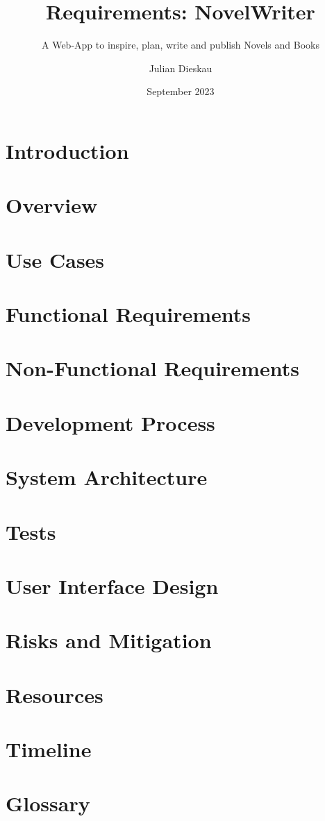 \documentclass[parskip=full,11pt]{scrartcl}
\title{Requirements: NovelWriter}
\subtitle{A Web-App to inspire, plan, write and publish Novels and Books}
\author{Julian Dieskau}
\date{September 2023}
\begin{document}
\maketitle
\pagebreak

\section{Introduction}


\section{Overview}


\section{Use Cases}

\pagebreak

\section{Functional Requirements}


\section{Non-Functional Requirements}


\section{Development Process}


\section{System Architecture}


\section{Tests}


\section{User Interface Design}


\section{Risks and Mitigation}


\section{Resources}


\section{Timeline}


\section{Glossary}

\end{document}
